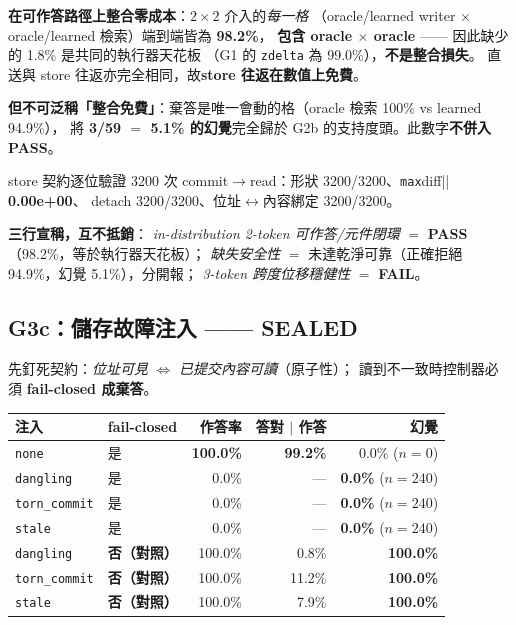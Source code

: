 \documentclass[11pt, a4paper]{article}
\newcommand{\PASS}{\textcolor{green!45!black}{\textbf{PASS}}}
\newcommand{\FAIL}{\textcolor{red!70!black}{\textbf{FAIL}}}
\newcommand{\SEALED}{\textcolor{blue!60!black}{\textbf{SEALED}}}
\begin{document}
\textbf{在可作答路徑上整合零成本}：$2\times2$ 介入的\emph{每一格}
（oracle/learned writer $\times$ oracle/learned 檢索）端到端皆為 \textbf{98.2\%}，
\textbf{包含 oracle $\times$ oracle} —— 因此缺少的 1.8\% 是共同的執行器天花板
（G1 的 \verb|zdelta| 為 99.0\%），\textbf{不是整合損失}。
直送與 store 往返亦完全相同，故\textbf{store 往返在數值上免費}。

\textbf{但不可泛稱「整合免費」}：棄答是唯一會動的格（oracle 檢索 100\% vs learned 94.9\%），
將 \textbf{3/59 $=$ 5.1\% 的幻覺}完全歸於 G2b 的支持度頭。此數字\textbf{不併入 PASS}。

store 契約逐位驗證 3200 次 commit$\to$read：形狀 3200/3200、\verb|max|diff|| \textbf{0.00e+00}、
detach 3200/3200、位址$\leftrightarrow$內容綁定 3200/3200。

\textbf{三行宣稱，互不抵銷}：
\emph{in-distribution 2-token 可作答/元件閉環} $=$ \PASS{}（98.2\%，等於執行器天花板）；
\emph{缺失安全性} $=$ 未達乾淨可靠（正確拒絕 94.9\%，幻覺 5.1\%），分開報；
\emph{3-token 跨度位移穩健性} $=$ \FAIL{}。

\subsection{G3c：儲存故障注入 —— \SEALED{}}

先釘死契約：\emph{位址可見} $\Leftrightarrow$ \emph{已提交內容可讀}（原子性）；
讀到不一致時控制器必須 \textbf{fail-closed 成棄答}。

\begin{table}[h]
\centering
\small
\begin{tabular}{llrrr}
\toprule
注入 & fail-closed & 作答率 & 答對 $\mid$ 作答 & \textbf{幻覺} \\
\midrule
\verb|none| & 是 & \textbf{100.0\%} & \textbf{99.2\%} & 0.0\% ($n{=}0$) \\
\verb|dangling| & 是 & 0.0\% & --- & \textbf{0.0\%} ($n{=}240$) \\
\verb|torn_commit| & 是 & 0.0\% & --- & \textbf{0.0\%} ($n{=}240$) \\
\verb|stale| & 是 & 0.0\% & --- & \textbf{0.0\%} ($n{=}240$) \\
\verb|dangling| & \textbf{否（對照）} & 100.0\% & 0.8\% & \textbf{100.0\%} \\
\verb|torn_commit| & \textbf{否（對照）} & 100.0\% & 11.2\% & \textbf{100.0\%} \\
\verb|stale| & \textbf{否（對照）} & 100.0\% & 7.9\% & \textbf{100.0\%} \\
\bottomrule
\end{tabular}
\end{table}
\end{document}
